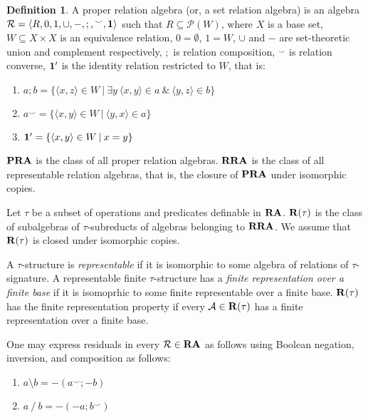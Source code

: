 \documentclass[a4paper]{article}
\theoremstyle{definition}
\newtheorem{definition}{Definition}
\theoremstyle{theorem}
\theoremstyle{proposition}
\theoremstyle{lemma}
\theoremstyle{ex}
\theoremstyle{corollary}
\theoremstyle{claim}
\begin{document}
\begin{definition}
    A proper relation algebra (or, a set relation algebra) is an algebra $\mathcal{R} = \langle R, 0, 1, \cup, -, ;, {}^{\smile}, {\bf 1 }\rangle$ such that $R \subseteq \mathcal{P}(W)$, where $X$ is a base set, $W \subseteq X \times X$ is an equivalence relation, $0 = \emptyset$, $1 = W$, $\cup$ and $-$ are set-theoretic union and complement respectively, $;$ is relation composition, ${}^{\smile}$ is relation converse,
    ${\bf 1}'$ is the identity relation restricted to $W$, that is:
    \begin{enumerate}
    \item $a ; b = \{ \langle x, z \rangle \in W \: | \: \exists y \: \langle x, y \rangle \in a \: \& \: \langle y, z \rangle \in b \}$
    \item $a^{\smile} = \{ \langle x, y \rangle \in W \: | \: \langle y, x \rangle \in a \}$
    \item ${\bf 1}' = \{ \langle x, y \rangle \in W \: | \: x = y \}$
    \end{enumerate}
       ${\bf PRA}$ is the class of all proper relation algebras. ${\bf RRA}$ is the class of all representable relation algebras, that is, the closure of ${\bf PRA}$ under isomorphic copies.
\end{definition}

Let $\tau$ be a subset of operations and predicates definable in ${\bf RA}$. ${\bf R}(\tau)$ is the class of subalgebras of $\tau$-subreducts of algebras belonging to ${\bf RRA}$. We assume that ${\bf R}(\tau)$ is closed under isomorphic copies.

A $\tau$-structure is \emph{representable} if it is isomorphic to some algebra of relations of $\tau$-signature. A representable finite $\tau$-structure has a \emph{finite representation over a finite base} if it is isomoprhic to some finite representable over a finite base. ${\bf R}(\tau)$ has the finite representation property if every $\mathcal{A} \in {\bf R}(\tau)$ has a finite representation over a finite base.

One may express residuals in every $\mathcal{R} \in {\bf RA}$ as follows using Boolean negation, inversion, and composition as follows:

\begin{enumerate}
  \item $a \setminus b = -(a^{\smile} ; -b)$
  \item $a \: / \: b = - (- a ; b^{\smile})$
\end{enumerate}
\end{document}
